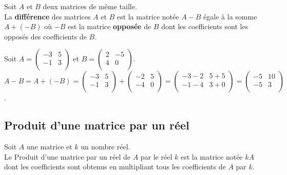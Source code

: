 \documentclass{cornouaille}
\begin{document}
\begin{definition}
Soit $A$ et $B$ deux matrices de même taille.\\
La \textbf{différence} des matrices $A$ et $B$ est la matrice notée $A-B$ égale à la somme $A+(-B)$ où $-B$ est
la matrice \textbf{opposée} de $B$ dont les coefficients sont les opposés des coefficients de $B$.
\end{definition}

\begin{exemple}
Soit $A=\begin{pmatrix}
-3 & 5  \\
-1 & 3  \\
\end{pmatrix}$ et $B=\begin{pmatrix}
2 & -5  \\
4 & 0  \\
\end{pmatrix}$.\\
$A-B=A+(-B)=
\begin{pmatrix}
-3 & 5  \\
-1 & 3  \\
\end{pmatrix}+\begin{pmatrix}
-2 & 5  \\
-4 & 0  \\
\end{pmatrix}=
\begin{pmatrix}
-3-2 & 5+5  \\
-1-4 & 3+0  \\
\end{pmatrix}=\begin{pmatrix}
-5 & 10  \\
-5 & 3  \\
\end{pmatrix}$.
\end{exemple}


\subsection{Produit d'une matrice par un réel}


\begin{definition}
Soit $A$ une matrice et $k$ un nombre réel.\\
Le Produit d'une matrice par un réel de $A$ par le réel $k$ est la matrice notée $kA$ dont les coefficients sont obtenus en multipliant tous les coefficients de $A$ par $k$.
\end{definition}
\end{document}
